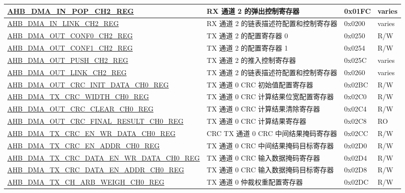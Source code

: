 \begin{longtable}{ | l | l | p{1.3cm} | l | }
\hyperref[regdesc:AHBDMAINPOPCHNREG]{AHB\_DMA\_IN\_POP\_CH2\_REG} & RX 通道 2 的弹出控制寄存器 & 0x01FC & varies \\ \hline
\hyperref[regdesc:AHBDMAINLINKCHNREG]{AHB\_DMA\_IN\_LINK\_CH2\_REG} & RX 通道 2 的链表描述符配置和控制寄存器 & 0x0200 & varies \\ \hline
\hyperref[regdesc:AHBDMAOUTCONF0CHNREG]{AHB\_DMA\_OUT\_CONF0\_CH2\_REG} & TX 通道 2 的配置寄存器 0 & 0x0250 & R/W \\ \hline
\hyperref[regdesc:AHBDMAOUTCONF1CHNREG]{AHB\_DMA\_OUT\_CONF1\_CH2\_REG} & TX 通道 2 的配置寄存器 1 & 0x0254 & R/W \\ \hline
\hyperref[regdesc:AHBDMAOUTPUSHCHNREG]{AHB\_DMA\_OUT\_PUSH\_CH2\_REG} & TX 通道 2 的推入控制寄存器 & 0x025C & varies \\ \hline
\hyperref[regdesc:AHBDMAOUTLINKCHNREG]{AHB\_DMA\_OUT\_LINK\_CH2\_REG} & TX 通道 2 的链表描述符配置和控制寄存器 & 0x0260 & varies \\ \hline
\hyperref[regdesc:AHBDMAOUTCRCINITDATACHNREG]{AHB\_DMA\_OUT\_CRC\_INIT\_DATA\_CH0\_REG} & TX 通道 0 CRC 初始值配置寄存器 & 0x02BC & R/W \\ \hline
\hyperref[regdesc:AHBDMATXCRCWIDTHCHNREG]{AHB\_DMA\_TX\_CRC\_WIDTH\_CH0\_REG} & TX 通道 0 CRC 计算结果位宽配置寄存器 & 0x02C0 & R/W \\ \hline
\hyperref[regdesc:AHBDMAOUTCRCCLEARCHNREG]{AHB\_DMA\_OUT\_CRC\_CLEAR\_CH0\_REG} & TX 通道 0 CRC 计算结果清除寄存器 & 0x02C4 & R/W \\ \hline
\hyperref[regdesc:AHBDMAOUTCRCFINALRESULTCHNREG]{AHB\_DMA\_OUT\_CRC\_FINAL\_RESULT\_CH0\_REG} & TX 通道 0 CRC 计算结果寄存器 & 0x02C8 & RO \\ \hline
\hyperref[regdesc:AHBDMATXCRCENWRDATACHNREG]{AHB\_DMA\_TX\_CRC\_EN\_WR\_DATA\_CH0\_REG} & CRC TX 通道 0 CRC 中间结果掩码寄存器 & 0x02CC & R/W \\ \hline
\hyperref[regdesc:AHBDMATXCRCENADDRCHNREG]{AHB\_DMA\_TX\_CRC\_EN\_ADDR\_CH0\_REG} & TX 通道 0 CRC 中间结果掩码目标寄存器 & 0x02D0 & R/W \\ \hline
\hyperref[regdesc:AHBDMATXCRCDATAENWRDATACHNREG]{AHB\_DMA\_TX\_CRC\_DATA\_EN\_WR\_DATA\_CH0\_REG} & TX 通道 0 CRC 输入数据掩码寄存器 & 0x02D4 & R/W \\ \hline
\hyperref[regdesc:AHBDMATXCRCDATAENADDRCHNREG]{AHB\_DMA\_TX\_CRC\_DATA\_EN\_ADDR\_CH0\_REG} & TX 通道 0 CRC 输入数据掩码目标寄存器 & 0x02D8 & R/W \\ \hline
\hyperref[regdesc:AHBDMATXCHARBWEIGHCHNREG]{AHB\_DMA\_TX\_CH\_ARB\_WEIGH\_CH0\_REG} & TX 通道 0 仲裁权重配置寄存器 & 0x02DC & R/W \\ \hline

\end{longtable}
